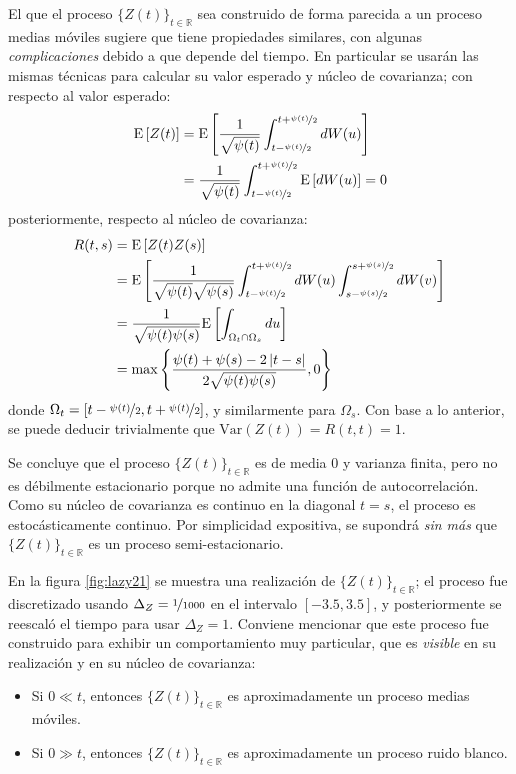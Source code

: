 \documentclass[12pt,letterpaper]{book}
\newcommand{\R}{\mathbb{R}}
\newcommand{\E}[1]{\mathrm{E}\left[ #1 \right]}
\newcommand{\Var}[1]{\mathrm{Var}\left( #1 \right)}
\newcommand{\abso}[1]{\left| #1 \right|}
\begin{document}
El que el proceso $\{Z(t)\}_{t\in\R}$ sea construido de forma parecida a un proceso medias móviles sugiere que tiene propiedades similares, con algunas \textit{complicaciones} debido a que depende del tiempo.
%
En particular se usarán las mismas técnicas para calcular su valor esperado y núcleo de covarianza; con respecto al valor esperado:
\begin{align*}
\E{Z(t)} &= 
\E{\frac{1}{\sqrt{\psi(t)}} \int_{t-\nicefrac{\psi(t)}{2}}^{t+\nicefrac{\psi(t)}{2}} dW(u)} \\
&=
\frac{1}{\sqrt{\psi(t)}} \int_{t-\nicefrac{\psi(t)}{2}}^{t+\nicefrac{\psi(t)}{2}} \E{dW(u)} = 0
\end{align*}
posteriormente, respecto al núcleo de covarianza:
\begin{align*}
R(t,s) &= \E{Z(t)Z(s)} \\
&=
\E{\frac{1}{\sqrt{\psi(t)}\sqrt{\psi(s)}}
\int_{t-\nicefrac{\psi(t)}{2}}^{t+\nicefrac{\psi(t)}{2}} dW(u)
\int_{s-\nicefrac{\psi(s)}{2}}^{s+\nicefrac{\psi(s)}{2}} dW(v)
} \\
&= 
\frac{1}{\sqrt{\psi(t) \psi(s)}}
\E{\int_{\Omega_t \cap \Omega_s} du} \\
&= \max{ \left\{ \frac{\psi(t) + \psi(s) - 2 \abso{t-s}}{2\sqrt{\psi(t)\psi(s)}}, 0 \right\} }
\end{align*}
donde $\Omega_t = \left[ t-\nicefrac{\psi(t)}{2} , t+\nicefrac{\psi(t)}{2} \right]$, y similarmente para $\Omega_s$.
%
Con base a lo anterior, se puede deducir trivialmente que $\Var{Z(t)} = R(t,t) = 1$.

Se concluye que el proceso $\{Z(t)\}_{t\in\R}$ es de media 0 y varianza finita, pero no es débilmente estacionario porque no admite una función de autocorrelación.
%
Como su núcleo de covarianza es continuo en la diagonal $t=s$, el proceso es estocásticamente continuo.
%
Por simplicidad expositiva, se supondrá \textit{sin más} que $\{Z(t)\}_{t\in\R}$ es un proceso semi-estacionario.

En la figura \ref{fig:lazy21} se muestra una realización de $\{Z(t)\}_{t\in\R}$; el proceso fue discretizado usando $\Delta_Z=\nicefrac{1}{1000}$ en el intervalo $[-3.5,3.5]$, y posteriormente se reescaló el tiempo para usar $\Delta_Z=1$.
%
Conviene mencionar que este proceso fue construido para exhibir un comportamiento muy particular, que es \textit{visible} en su realización y en su núcleo de covarianza: 
\begin{itemize}
\item Si $0 \ll t$, entonces $\{Z(t)\}_{t\in\R}$ es aproximadamente un proceso medias móviles.
\item Si $0 \gg t$, entonces $\{Z(t)\}_{t\in\R}$ es aproximadamente un proceso ruido blanco.
\end{itemize}
\end{document}
